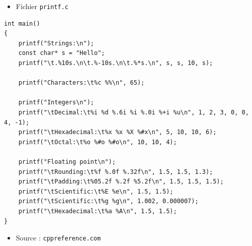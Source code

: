 \begin{frame}[containsverbatim]
\begin{itemize}
\item Fichier \texttt{printf.c}
\end{itemize}
\begin{lstlisting}
int main()
{
    printf("Strings:\n");
    const char* s = "Hello";
    printf("\t.%10s.\n\t.%-10s.\n\t.%*s.\n", s, s, 10, s);
 
    printf("Characters:\t%c %%\n", 65);
 
    printf("Integers\n");
    printf("\tDecimal:\t%i %d %.6i %i %.0i %+i %u\n", 1, 2, 3, 0, 0, 4, -1);
    printf("\tHexadecimal:\t%x %x %X %#x\n", 5, 10, 10, 6);
    printf("\tOctal:\t%o %#o %#o\n", 10, 10, 4);
 
    printf("Floating point\n");
    printf("\tRounding:\t%f %.0f %.32f\n", 1.5, 1.5, 1.3);
    printf("\tPadding:\t%05.2f %.2f %5.2f\n", 1.5, 1.5, 1.5);
    printf("\tScientific:\t%E %e\n", 1.5, 1.5);
    printf("\tScientific:\t%g %g\n", 1.002, 0.000007);
    printf("\tHexadecimal:\t%a %A\n", 1.5, 1.5);
}
\end{lstlisting}
\begin{itemize}
\item Source : \texttt{cppreference.com}
\end{itemize}
\end{frame}

